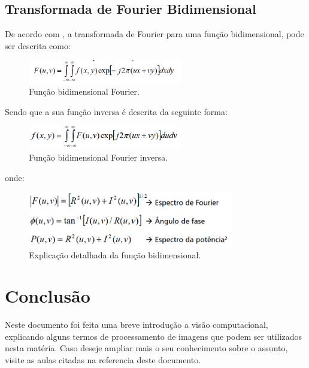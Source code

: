\documentclass{article}
\begin{document}
    \subsection{Transformada de Fourier Bidimensional}
    
    De acordo com , a transformada de Fourier para uma função bidimensional, pode ser descrita como:
    
    \begin{figure}[H]
        \centering
        \includegraphics[width=0.6\textwidth]{template/img/fig16.png}
        \caption{Função bidimensional Fourier.}
        \label{fig:fig16}
    \end{figure}
    
    Sendo que a sua função inversa é descrita da seguinte forma:
    
     \begin{figure}[H]
        \centering
        \includegraphics[width=0.6\textwidth]{template/img/fig17.png}
        \caption{Função bidimensional Fourier inversa.}
        \label{fig:fig17}
    \end{figure}
    
    onde:
    
    \begin{figure}[H]
        \centering
        \includegraphics[width=0.8\textwidth]{template/img/fig18.png}
        \caption{Explicação detalhada da função bidimensional.}
        \label{fig:fig18}
    \end{figure}
    
    \section{Conclusão}
    Neste documento foi feita uma breve introdução a visão computacional, explicando alguns termos de processamento de imagens que podem ser utilizados nesta matéria. Caso deseje ampliar mais o seu conhecimento sobre o assunto, visite as aulas citadas na referencia deste documento.

\medskip

\small


\end{document}
